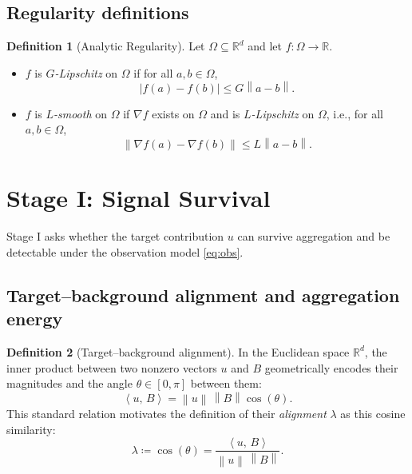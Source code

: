 \documentclass{article}
\theoremstyle{plain}
\theoremstyle{definition}
\newtheorem{definition}{Definition}
\theoremstyle{remark}
\numberwithin{theorem}{section}
\numberwithin{definition}{section}
\numberwithin{remark}{section}
\numberwithin{lemma}{section}
\numberwithin{assumption}{section}
\newcommand{\R}{\mathbb{R}}
\newcommand{\ip}[2]{\left\langle #1,\,#2 \right\rangle}
\newcommand{\norm}[1]{\left\lVert #1 \right\rVert}
\newcommand{\utarget}{u}
\begin{document}
\subsection{Regularity definitions}

\begin{definition}[Analytic Regularity]
\label{def:lipschitz_smooth}
Let $\Omega\subseteq\R^d$ and let $f:\Omega\to\R$.
\begin{itemize}[leftmargin=1.5em]
    \item $f$ is \emph{$G$-Lipschitz} on $\Omega$ if for all $a,b\in\Omega$,
    \[
    |f(a)-f(b)|\le G\norm{a-b}.
    \]
    \item $f$ is \emph{$L$-smooth} on $\Omega$ if $\nabla f$ exists on $\Omega$ and is \emph{$L$-Lipschitz} on $\Omega$, i.e., for all $a,b\in\Omega$,
    \[
    \norm{\nabla f(a)-\nabla f(b)}\le L\norm{a-b}.
    \]
\end{itemize}
\end{definition}

\section{Stage I: Signal Survival}
\label{sec:stage1}

Stage I asks whether the target contribution $\utarget$ can survive aggregation and be detectable under the observation model \eqref{eq:obs}.

\subsection{Target--background alignment and aggregation energy}

\begin{definition}[Target--background alignment]
\label{def:lambda}
In the Euclidean space $\R^d$, the inner product between two nonzero vectors $\utarget$ and $B$ geometrically encodes their magnitudes and the angle $\theta \in [0, \pi]$ between them:
\begin{equation}
\label{eq:inner_prod_geom}
\ip{\utarget}{B} = \norm{\utarget}\,\norm{B}\cos(\theta).
\end{equation}
This standard relation motivates the definition of their \emph{alignment} $\lambda$ as this cosine similarity:
\begin{equation}
\label{eq:lambda}
\lambda \coloneqq \cos(\theta)
= \frac{\ip{\utarget}{B}}{\norm{\utarget}\,\norm{B}}.
\end{equation}
\end{definition}
\end{document}
